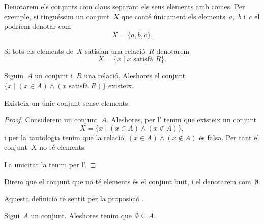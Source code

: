 \documentclass[../../main.tex]{subfiles}
\begin{document}
    \begin{notation}
        Denotarem els conjunts com claus separant els seus elements amb comes.
        Per exemple, si tinguéssim un conjunt~\(X\) que conté únicament els elements~\(a\),~\(b\) i~\(c\) el podríem denotar com
        \[
            X=\{a,b,c\}.
        \]

        Si tots els elements de~\(X\) satisfan una relació~\(R\) denotarem
        \[
            X=\{x\mid x\text{ satisfà }R\}.
        \]
    \end{notation}
    \begin{axiom}
        \label{axiom:axioma de separació}
        Siguin~\(A\) un conjunt i~\(R\) una relació.
        Aleshores el conjunt~\(\{x\mid(x\in A)\land(x\text{ satisfà }R)\}\) existeix.
    \end{axiom}
    \begin{proposition}
        \label{prop:conjunt buit}
        Existeix un únic conjunt sense elements.
    \end{proposition}
    \begin{proof}
        Considerem un conjunt~\(A\).
        Aleshores, per l' tenim que existeix un conjunt
        \[
            X=\{x\mid(x\in A)\land(x\notin A)\},
        \]
        i per la tautologia  tenim que la relació~\((x\in A)\land(x\notin A)\) és falsa.
        Per tant el conjunt~\(X\) no té elements.

        La unicitat la tenim per l'.
    \end{proof}
    \begin{definition}
        Direm que el conjunt que no té elements és el conjunt buit, i el denotarem com~\(\emptyset\).

        Aquesta definició té sentit per la proposició .
    \end{definition}
    \begin{axiom}
        \label{axiom:axioma de regularitat}
        Sigui~\(A\) un conjunt.
        Aleshores tenim que~\(\emptyset\subseteq A\).
    \end{axiom}
\end{document}
